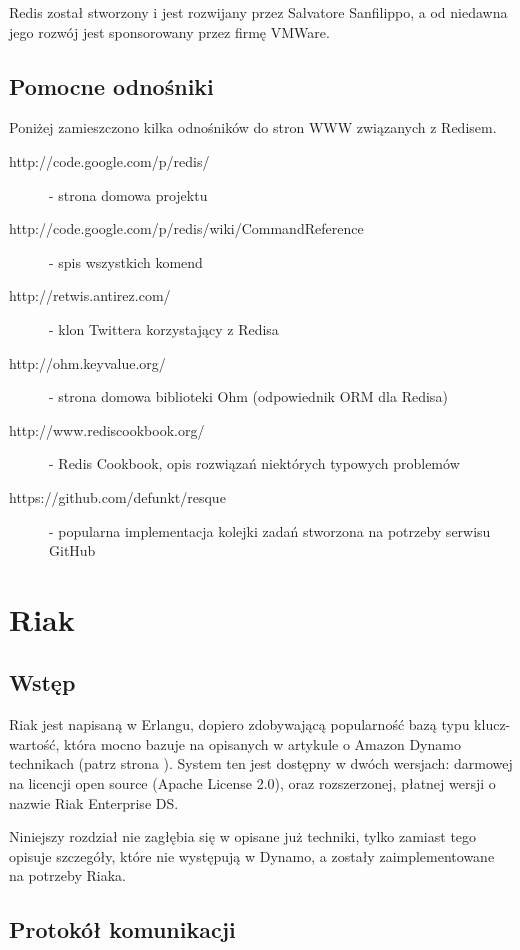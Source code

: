 Redis został stworzony i jest rozwijany przez Salvatore Sanfilippo, a od niedawna jego rozwój jest sponsorowany przez firmę VMWare.

\subsection*{Pomocne odnośniki}
 
Poniżej zamieszczono kilka odnośników do stron WWW związanych z Redisem.

\begin{description}
 \item [http://code.google.com/p/redis/] - strona domowa projektu
 \item [http://code.google.com/p/redis/wiki/CommandReference] - spis wszystkich komend
 \item [http://retwis.antirez.com/] - klon Twittera korzystający z Redisa
 \item [http://ohm.keyvalue.org/] - strona domowa biblioteki Ohm (odpowiednik ORM dla Redisa)
 \item [http://www.rediscookbook.org/] - Redis Cookbook, opis rozwiązań niektórych typowych problemów
 \item [https://github.com/defunkt/resque] - popularna implementacja kolejki zadań stworzona na potrzeby serwisu GitHub
\end{description}

\section{Riak}
\label{sec:riak}

\subsection*{Wstęp} 

Riak jest napisaną w Erlangu, dopiero zdobywającą popularność bazą typu klucz-wartość, która mocno bazuje na opisanych w artykule o Amazon Dynamo technikach (patrz strona \pageref{sec:dynamo-techniki}).
System ten jest dostępny w dwóch wersjach: darmowej na licencji open source (Apache License 2.0), oraz rozszerzonej, płatnej wersji o nazwie Riak Enterprise DS.

Niniejszy rozdział nie zagłębia się w opisane już techniki, tylko zamiast tego opisuje szczegóły, które nie występują w Dynamo, a zostały zaimplementowane na potrzeby Riaka.

\subsection*{Protokół komunikacji}

